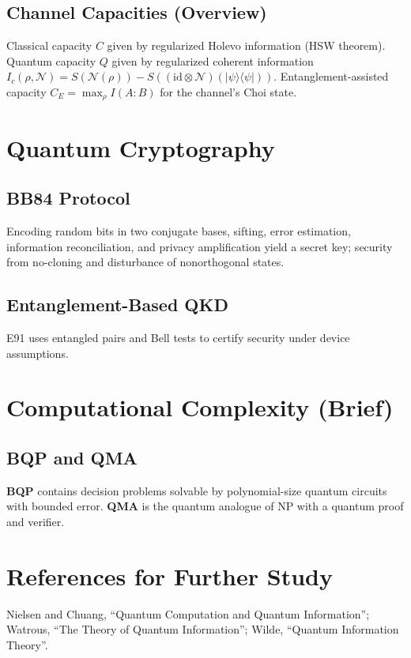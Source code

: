 \documentclass[11pt]{article}
\theoremstyle{definition}
\newcommand{\ket}[1]{\lvert #1 \rangle}
\newcommand{\bra}[1]{\langle #1 \rvert}
\begin{document}
\subsection{Channel Capacities (Overview)}
Classical capacity $C$ given by regularized Holevo information (HSW theorem). Quantum capacity $Q$ given by regularized coherent information $I_c(\rho,\mathcal{N})=S(\mathcal{N}(\rho))-S((\mathrm{id}\otimes\mathcal{N})(\ket{\psi}\!\bra{\psi}))$. Entanglement-assisted capacity $C_E=\max_{\rho} I(A:B)$ for the channel's Choi state.

\section{Quantum Cryptography}

\subsection{BB84 Protocol}
Encoding random bits in two conjugate bases, sifting, error estimation, information reconciliation, and privacy amplification yield a secret key; security from no-cloning and disturbance of nonorthogonal states.

\subsection{Entanglement-Based QKD}
E91 uses entangled pairs and Bell tests to certify security under device assumptions.

\section{Computational Complexity (Brief)}

\subsection{BQP and QMA}
\textbf{BQP} contains decision problems solvable by polynomial-size quantum circuits with bounded error. \textbf{QMA} is the quantum analogue of NP with a quantum proof and verifier.

\section{References for Further Study}

Nielsen and Chuang, ``Quantum Computation and Quantum Information''; Watrous, ``The Theory of Quantum Information''; Wilde, ``Quantum Information Theory''.
\end{document}
